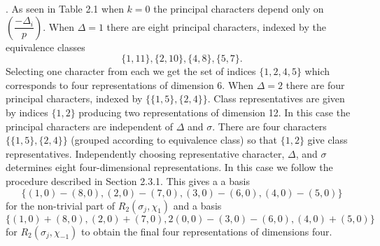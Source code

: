 \documentclass[12pt,reqno]{amsart}
\theoremstyle{remark}
\numberwithin{table}{section}
\begin{document}
. As seen in Table 2.1 when $k=0$ the principal characters depend only on $\left(\dfrac{-\Delta_i}{p}\right)$. When $\Delta=1$ there are eight principal characters, indexed by the equivalence classes
$$ \{1,11\},\{2,10\},\{4,8\},\{5,7\}.$$
Selecting one character from each we get  the set of indices $\{1,2,4,5\}$ which corresponds to four representations of dimension 6. When $\Delta=2$ there are four principal characters, indexed by $\{\{1,5\},\{2,4\}\}$.  Class representatives are given by indices  $\{1,2\}$ producing two representations of dimension 12. 
 In this case the principal characters are independent of $\Delta$ and $\sigma$. There are four characters $\{\{1,5\},\{2,4\}\}$ (grouped according to equivalence class) so that  $\{1,2\}$ give class representatives. Independently choosing representative character, $\Delta$, and $\sigma$ determines  eight four-dimensional representations. 
  In this case we follow the procedure described in Section 2.3.1. This gives a a basis $$\{(1,0)-(8,0),(2,0)-(7,0),(3,0)-(6,0),(4,0)-(5,0)\}$$ for the non-trivial part of $R_2(\sigma_j,\chi_1)$ and a basis $$\{(1,0)+(8,0),(2,0)+(7,0),2(0,0)-(3,0)-(6,0),(4,0)+(5,0)\}$$ for $R_2(\sigma_j,\chi_{-1})$ to obtain the final four representations of dimensions four. 
\end{document}
